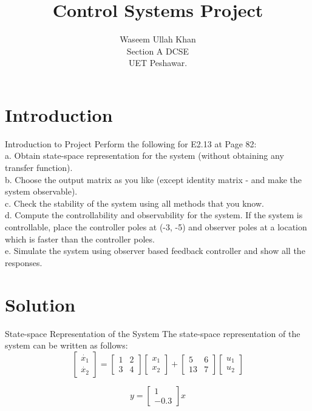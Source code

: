 \documentclass[10pt,compress,mathserif]{beamer}
\title[]{Control Systems Project}
\author[]{Waseem Ullah Khan\\ Section A DCSE \\ UET Peshawar.}
\begin{document}
\begin{frame}    \titlepage \end{frame}



\section{Introduction}
\begin{frame}{Introduction to Project}
\noindent Perform the following for E2.13 at Page 82:\\ \vskip10pt
a. Obtain state-space representation for the system (without obtaining any transfer function). \\ \vskip10pt
b. Choose the output matrix as you like (except identity matrix - and make the system observable). \\ \vskip10pt
c. Check the stability of the system using all methods that you know.\\ \vskip10pt
d. Compute the controllability and observability for the system. If the system is controllable, place the controller poles at (-3, -5) and observer poles at a location which is faster than the controller poles.\\ \vskip10pt
e. Simulate the system using observer based feedback controller and show all the responses.

\end{frame}



\section{Solution}
\begin{frame}{State-space Representation of the System}
The state-space representation of the system can be written as follows:
\begin{equation}
\begin{bmatrix} \dot{x_1}\\  \dot{x_2} \end{bmatrix}
= \begin{bmatrix}
1 & 2 \\
3 & 4  \end{bmatrix}
\begin{bmatrix} x_1\\  x_2 \end{bmatrix} +
\begin{bmatrix}
5 & 6 \\
13 & 7  \end{bmatrix}
\begin{bmatrix} u_1\\  u_2 \end{bmatrix}
\end{equation}

\begin{equation}
y=\begin{bmatrix}
1 \\ -0.3
\end{bmatrix}x
\end{equation}

\end{frame}
\end{document}
